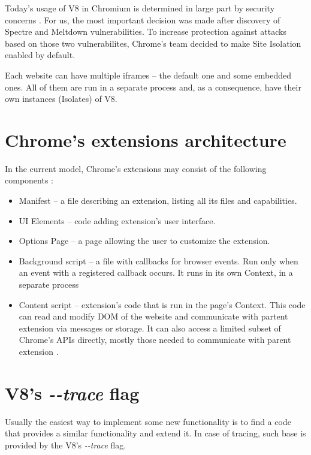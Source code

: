 Today's usage of V8 in Chromium is determined in large part by security concerns \cite{v8:spectre}.
For us, the most important decision was made after discovery of Spectre \cite{Kocher2018spectre} 
and Meltdown \cite{Lipp2018meltdown} vulnerabilities.
To increase protection against attacks based on those two vulnerabilites, Chrome's team decided to make
Site Isolation enabled by default. \cite{chrome:site-isolation}

Each website can have multiple iframes -- the default one and some embedded ones. All of them
are run in a separate process and, as a consequence, have their own instances (Isolates) of V8.


\section{Chrome's extensions architecture}

In the current model, Chrome's extensions may consist of the following components \cite{chrome:extensions}:
\begin{itemize}
  \item Manifest -- a file describing an extension, listing all its files and capabilities.
  \item UI Elements -- code adding extension's user interface.
  \item Options Page -- a page allowing the user to customize the extension.
  \item Background script -- a file with callbacks for browser events. Run only when an event with a registered callback occurs.
           It runs in its own Context, in a separate process
  \item Content script -- extension's code that is run in the page's Context. This code can read and modify DOM
           of the website and communicate with partent extension via messages or storage.
           It can also access a limited subset of Chrome's APIs directly, mostly those needed to communicate
           with parent extension \cite{chrome:content-scripts}.
\end{itemize}


\section{V8's \emph{-{}-trace} flag}

Usually the easiest way to implement some new functionality is to find a code that provides a similar
functionality and extend it. In case of tracing, such base is provided by the V8's \emph{-{}-trace} flag.

